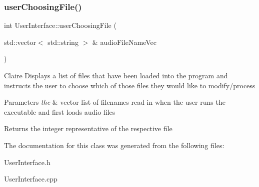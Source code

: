 \subsubsection{\texorpdfstring{user\+Choosing\+File()}{userChoosingFile()}}
{\footnotesize\ttfamily int User\+Interface\+::user\+Choosing\+File (\begin{DoxyParamCaption}\item[{std\+::vector$<$ std\+::string $>$ \&}]{audio\+File\+Name\+Vec }\end{DoxyParamCaption})}

Claire Displays a list of files that have been loaded into the program and instructs the user to choose which of those files they would like to modify/process 
\begin{DoxyParams}{Parameters}
{\em the} & vector list of filenames read in when the user runs the executable and first loads audio files \\
\hline
\end{DoxyParams}
\begin{DoxyReturn}{Returns}
the integer representative of the respective file 
\end{DoxyReturn}


The documentation for this class was generated from the following files\+:\begin{DoxyCompactItemize}
\item 
User\+Interface.\+h\item 
User\+Interface.\+cpp\end{DoxyCompactItemize}
